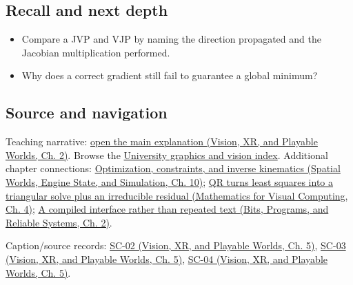 \subsection{Recall and next depth}\label{appendix-40df0855b4a7-recall-and-next-depth}

\begin{itemize}
\tightlist
\item
  Compare a JVP and VJP by naming the direction propagated and the Jacobian multiplication performed.
\item
  Why does a correct gradient still fail to guarantee a global minimum?
\end{itemize}

\subsection{Source and navigation}\label{appendix-40df0855b4a7-source-and-navigation}

Teaching narrative: \href{../07-Vision-XR-and-Playable-Worlds/main.pdf\#nameddest=04-visual-computing-ii-ch031-learning-a-visual-classifier-from-examples}{open the main explanation (Vision, XR, and Playable Worlds, Ch. 2)}. Browse the \hyperref[appendix-a6d556a4ef50-university-graphics-vision-and-photography---independent-series]{University graphics and vision index}. Additional chapter connections: \href{../05-Spatial-Worlds-Engine-State-and-Simulation/main.pdf\#nameddest=04-visual-computing-ii-ch029-optimization-constraints-and-inverse-kinematics}{Optimization, constraints, and inverse kinematics (Spatial Worlds, Engine State, and Simulation, Ch. 10)}; \href{../02-Mathematics-for-Visual-Computing/main.pdf\#nameddest=01-foundations-i-ch020-qr-turns-least-squares-into-a-triangular-solve-plus-an-irreducible-residual}{QR turns least squares into a triangular solve plus an irreducible residual (Mathematics for Visual Computing, Ch. 4)}; \href{../01-Bits-Programs-and-Reliable-Systems/main.pdf\#nameddest=01-foundations-i-ch002-a-compiled-interface-rather-than-repeated-text}{A compiled interface rather than repeated text (Bits, Programs, and Reliable Systems, Ch. 2)}.

Caption/source records: \href{../07-Vision-XR-and-Playable-Worlds/main.pdf\#nameddest=04-visual-computing-ii-ch036-sc-02---stanford-cs231n-spring-2025-lecture-2-image-classification-with-linear-classifiers}{SC-02 (Vision, XR, and Playable Worlds, Ch. 5)}, \href{../07-Vision-XR-and-Playable-Worlds/main.pdf\#nameddest=04-visual-computing-ii-ch036-sc-03---stanford-cs231n-spring-2025-lecture-3-regularization-and-optimization}{SC-03 (Vision, XR, and Playable Worlds, Ch. 5)}, \href{../07-Vision-XR-and-Playable-Worlds/main.pdf\#nameddest=04-visual-computing-ii-ch036-sc-04---stanford-cs231n-spring-2025-lecture-4-neural-networks-and-backpropagation}{SC-04 (Vision, XR, and Playable Worlds, Ch. 5)}.

